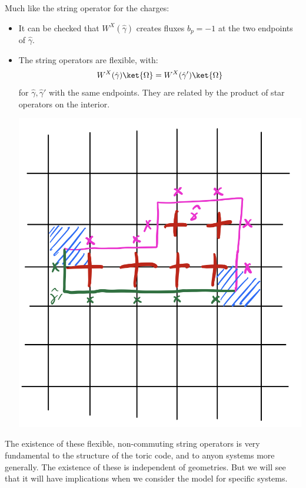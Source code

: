 Much like the string operator for the charges:
\begin{itemize}
    \item It can be checked that $W^X(\hat{\gamma})$ creates fluxes $b_p = -1$ at the two endpoints of $\hat{\gamma}$.
    \item The string operators are flexible, with:
    \begin{equation}
        W^X(\hat{\gamma})\ket{\Omega} = W^X(\hat{\gamma}')\ket{\Omega}
    \end{equation}
    for $\hat{\gamma}, \hat{\gamma}'$ with the same endpoints. They are related by the product of star operators on the interior.
    \begin{center}
        \includegraphics[scale=0.4]{Lectures/Images/lec2-fluxstring2.png}
    \end{center}
\end{itemize}

The existence of these flexible, non-commuting string operators is very fundamental to the structure of the toric code, and to anyon systems more generally. The existence of these is independent of geometries. But we will see that it will have implications when we consider the model for specific systems.

